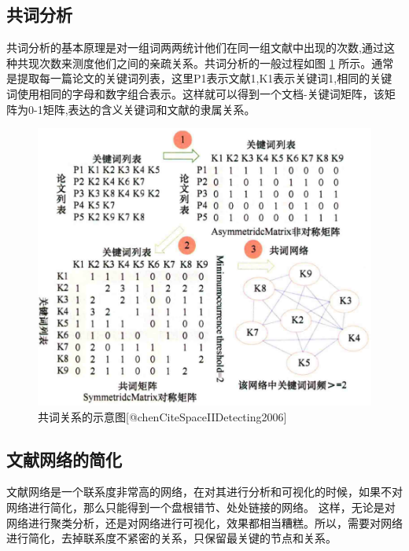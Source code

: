 \documentclass[]{ctexbook}
\begin{document}
\hypertarget{ux5171ux8bcdux5206ux6790}{%
\subsection{共词分析}\label{ux5171ux8bcdux5206ux6790}}

共词分析的基本原理是对一组词两两统计他们在同一组文献中出现的次数,通过这种共现次数来测度他们之间的亲疏关系。共词分析的一般过程如图 \ref{fig:co-occurance-example} 所示。通常是提取每一篇论文的关键词列表，这里P1表示文献1,K1表示关键词1,相同的关键词使用相同的字母和数字组合表示。这样就可以得到一个文档-关键词矩阵，该矩阵为0-1矩阵,表达的含义关键词和文献的隶属关系。

\begin{figure}
\includegraphics[width=1\linewidth]{citespace/co-occurance-example} \caption{共词关系的示意图[@chenCiteSpaceIIDetecting2006]}\label{fig:co-occurance-example}
\end{figure}

\hypertarget{ux6587ux732eux7f51ux7edcux7684ux7b80ux5316}{%
\subsection{文献网络的简化}\label{ux6587ux732eux7f51ux7edcux7684ux7b80ux5316}}

文献网络是一个联系度非常高的网络，在对其进行分析和可视化的时候，如果不对网络进行简化，那么只能得到一个盘根错节、处处链接的网络。
这样，无论是对网络进行聚类分析，还是对网络进行可视化，效果都相当糟糕。所以，需要对网络进行简化，去掉联系度不紧密的关系，只保留最关键的节点和关系。
\end{document}
